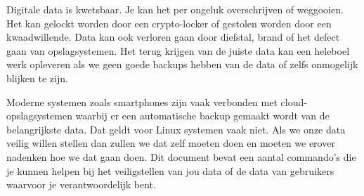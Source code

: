 Digitale data is kwetsbaar. Je kan het per ongeluk overschrijven of weggooien. Het kan gelockt worden door een crypto-locker of gestolen worden door een kwaadwillende. Data kan ook verloren gaan door diefstal, brand of het defect gaan van opslagsystemen. Het terug krijgen van de juiste data kan een heleboel werk opleveren als we geen goede backups hebben van de data of zelfs onmogelijk blijken te zijn.

Moderne systemen zoals smartphones zijn vaak verbonden met cloud-opslagsystemen waarbij er een automatische backup gemaakt wordt van de belangrijkste data. Dat geldt voor Linux systemen vaak niet. Als we onze data veilig willen stellen dan zullen we dat zelf moeten doen en moeten we erover nadenken hoe we dat gaan doen. Dit document bevat een aantal commando's die je kunnen helpen bij het veiligstellen van jou data of de data van gebruikers waarvoor je verantwoordelijk bent.


